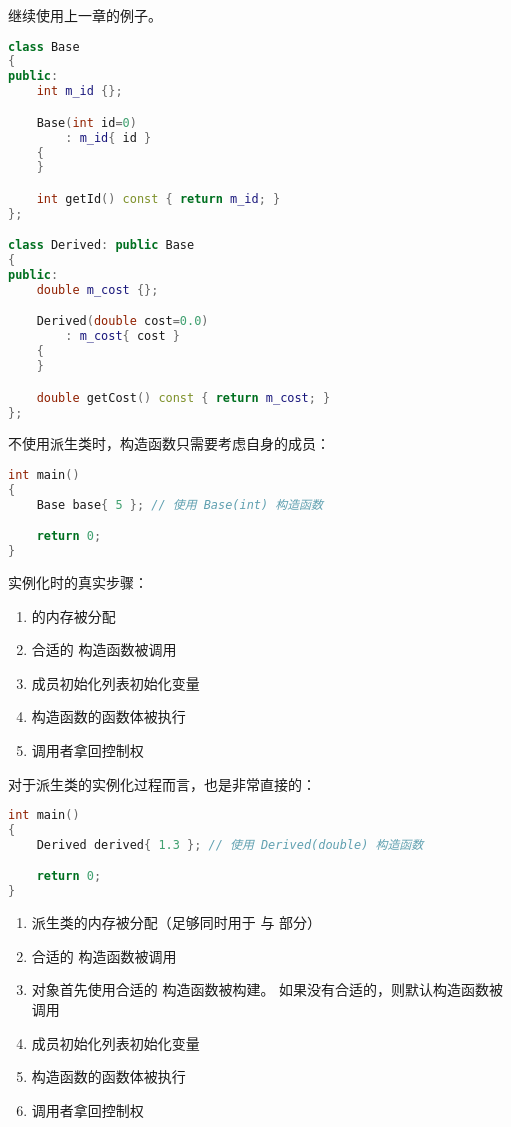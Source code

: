 \documentclass[../../LearnCpp.tex]{subfiles}
\begin{document}

继续使用上一章的例子。

\begin{lstlisting}[language=C++]
class Base
{
public:
    int m_id {};

    Base(int id=0)
        : m_id{ id }
    {
    }

    int getId() const { return m_id; }
};

class Derived: public Base
{
public:
    double m_cost {};

    Derived(double cost=0.0)
        : m_cost{ cost }
    {
    }

    double getCost() const { return m_cost; }
};
\end{lstlisting}

不使用派生类时，构造函数只需要考虑自身的成员：

\begin{lstlisting}[language=C++]
int main()
{
    Base base{ 5 }; // 使用 Base(int) 构造函数

    return 0;
}
\end{lstlisting}

实例化时的真实步骤：

\begin{enumerate}
    \item {} 的内存被分配
    \item 合适的  构造函数被调用
    \item 成员初始化列表初始化变量
    \item 构造函数的函数体被执行
    \item 调用者拿回控制权
\end{enumerate}

对于派生类的实例化过程而言，也是非常直接的：

\begin{lstlisting}[language=C++]
int main()
{
    Derived derived{ 1.3 }; // 使用 Derived(double) 构造函数

    return 0;
}
\end{lstlisting}

\begin{enumerate}
    \item 派生类的内存被分配（足够同时用于  与  部分）
    \item 合适的  构造函数被调用
    \item {} 对象首先使用合适的  构造函数被构建。
          如果没有合适的，则默认构造函数被调用
    \item 成员初始化列表初始化变量
    \item 构造函数的函数体被执行
    \item 调用者拿回控制权
\end{enumerate}
\end{document}
